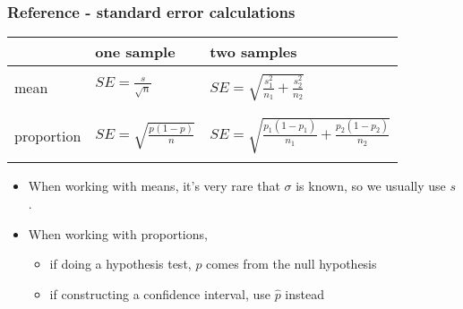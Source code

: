 \begin{frame}
\frametitle{Reference - standard error calculations}

\begin{center}
\begin{tabular}{l | l | l}
			& one sample					& two samples \\ 
\hline
& & \\
mean		& $SE = \frac{s}{\sqrt{n}}$			& $SE = \sqrt{ \frac{s_1^2}{n_1} + \frac{s_2^2}{n_2}}$ \\
& & \\
\hline
& & \\
proportion		& $SE = \sqrt{ \frac{p(1-p)}{n} }$	& $SE = \sqrt{ \frac{p_1(1-p_1)}{n_1} + \frac{p_2(1-p_2)}{n_2} }$	 \\	
& & \\
\end{tabular}
\end{center}

\pause

\begin{itemize}

\item When working with means, it's very rare that $\sigma$ is known, so we usually use $s$.

\pause

\item When working with proportions, 
\begin{itemize}
\item if doing a hypothesis test, $p$ comes from the null hypothesis
\item if constructing a confidence interval, use $\hat{p}$ instead
\end{itemize}

\end{itemize}

\end{frame}